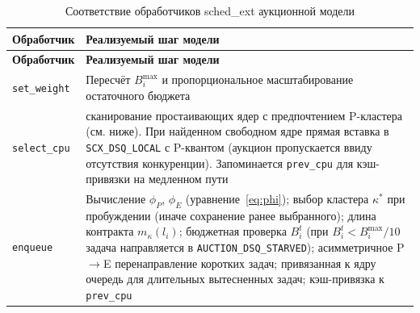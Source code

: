 \documentclass[14pt, oneside]{extbook}
\begin{document}
        \begin{center}
        \begin{longtable}{|P{3cm}|P{11.5cm}|}
                \caption{Соответствие обработчиков sched\_ext аукционной модели}
                \label{tab:auction_ops} \\
                \hline
                \textbf{Обработчик} & \textbf{Реализуемый шаг модели} \\
                \hline
                \endfirsthead
                \hline
                \textbf{Обработчик} & \textbf{Реализуемый шаг модели} \\
                \hline
                \endhead
                        \texttt{set\_weight} & Пересчёт
                                $B_i^{\max}$ и пропорциональное
                                масштабирование остаточного
                                бюджета \\
                        \hline
                        \texttt{select\_cpu} & сканирование простаивающих
                                ядер с предпочтением P-кластера (см. ниже).
                                При найденном свободном ядре
                                прямая вставка в
                                \texttt{SCX\_DSQ\_LOCAL} с
                                P-квантом (аукцион пропускается
                                ввиду отсутствия конкуренции).
                                Запоминается \texttt{prev\_cpu}
                                для кэш-привязки на медленном
                                пути \\
                        \hline
                        \texttt{enqueue} & Вычисление
                                $\phi_P$, $\phi_E$
                                (уравнение~\eqref{eq:phi}); выбор
                                кластера $\kappa^*$ при
                                пробуждении (иначе сохранение
                                ранее выбранного); длина
                                контракта $m_\kappa(l_i)$;
                                бюджетная проверка $B_i^t$
                                (при $B_i^t < B_i^{\max}/10$
                                задача направляется в
                                \texttt{AUCTION\_DSQ\_STARVED});
                                асимметричное P$\to$E
                                перенаправление коротких задач;
                                привязанная к ядру очередь для
                                длительных вытесненных задач;
                                кэш-привязка к \texttt{prev\_cpu}

\end{longtable}
\end{center}
\end{document}
